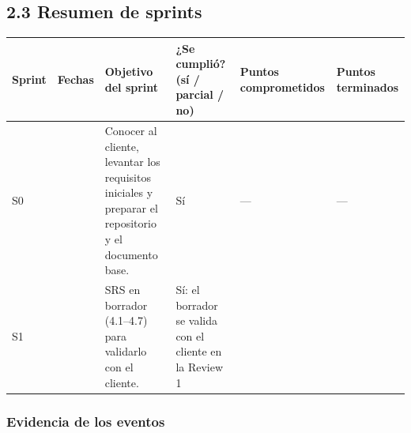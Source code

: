 \subsection{2.3 Resumen de sprints}\label{resumen-de-sprints}

{\def\LTcaptype{none} %
\begin{longtable}[]{@{}
  >{\raggedright\arraybackslash}p{}
  >{\raggedright\arraybackslash}p{}
  >{\raggedright\arraybackslash}p{}
  >{\raggedright\arraybackslash}p{}
  >{\raggedright\arraybackslash}p{}
  >{\raggedright\arraybackslash}p{}@{}}
\toprule\noalign{}
\begin{minipage}[b]{\linewidth}\raggedright
\textbf{Sprint}
\end{minipage} & \begin{minipage}[b]{\linewidth}\raggedright
\textbf{Fechas}
\end{minipage} & \begin{minipage}[b]{\linewidth}\raggedright
\textbf{Objetivo del sprint}
\end{minipage} & \begin{minipage}[b]{\linewidth}\raggedright
\textbf{¿Se cumplió? (sí / parcial / no)}
\end{minipage} & \begin{minipage}[b]{\linewidth}\raggedright
\textbf{Puntos comprometidos}
\end{minipage} & \begin{minipage}[b]{\linewidth}\raggedright
\textbf{Puntos terminados}
\end{minipage} \\
\midrule\noalign{}
\endhead
\bottomrule\noalign{}
\endlastfoot
S0 & \pendiente{} & Conocer al cliente, levantar los requisitos
iniciales y preparar el repositorio y el documento base. &
Sí & --- & --- \\
S1 & \pendiente{} & SRS en borrador (4.1--4.7) para validarlo con el
cliente. & Sí: el borrador se valida con el cliente en la Review 1 &
\pendiente{} & \pendiente{} \\
\end{longtable}
}

\subsubsection{Evidencia de los eventos}\label{evidencia-de-los-eventos}


